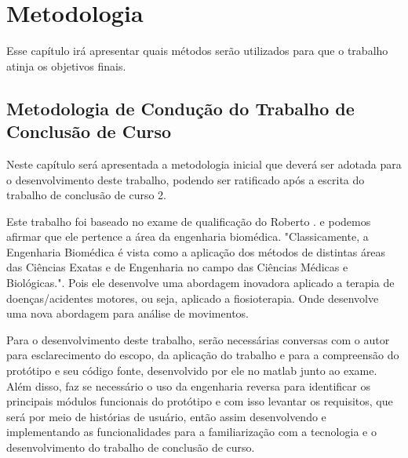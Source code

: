 
\chapter[Metodologia]{Metodologia}
  Esse capítulo irá apresentar quais métodos serão utilizados para que o trabalho
atinja os objetivos finais.

\section{Metodologia de Condução do Trabalho de Conclusão de Curso}
\label{Sec:MetCondTCC}
  Neste capítulo será apresentada a metodologia inicial que deverá ser adotada
para o desenvolvimento deste trabalho, podendo ser ratificado após a escrita do
trabalho de conclusão de curso 2.

  Este trabalho foi baseado no exame de qualificação do Roberto \cite{roberto}.
e podemos afirmar que ele pertence a área da engenharia biomédica. "Classicamente, 
a Engenharia Biomédica é vista como a aplicação dos métodos de distintas áreas 
das Ciências Exatas e de Engenharia no campo das Ciências Médicas e 
Biológicas."\cite{engenhariaBiomedica}. Pois ele desenvolve uma abordagem 
inovadora aplicado a terapia de  doenças/acidentes motores, ou seja, aplicado a
 fiosioterapia. Onde desenvolve uma nova abordagem para análise de movimentos.

  Para o desenvolvimento deste trabalho, serão necessárias conversas com 
o autor para esclarecimento do escopo, da aplicação do trabalho e para a compreensão
do protótipo e seu código fonte, desenvolvido por ele no matlab junto ao exame. 
Além disso, faz se necessário o uso da engenharia reversa para identificar os 
principais módulos funcionais do protótipo e com isso levantar os requisitos, 
que será por meio de histórias de usuário, então assim desenvolvendo e 
implementando as funcionalidades para a familiarização com a tecnologia e o 
desenvolvimento do trabalho de conclusão de curso.
  
